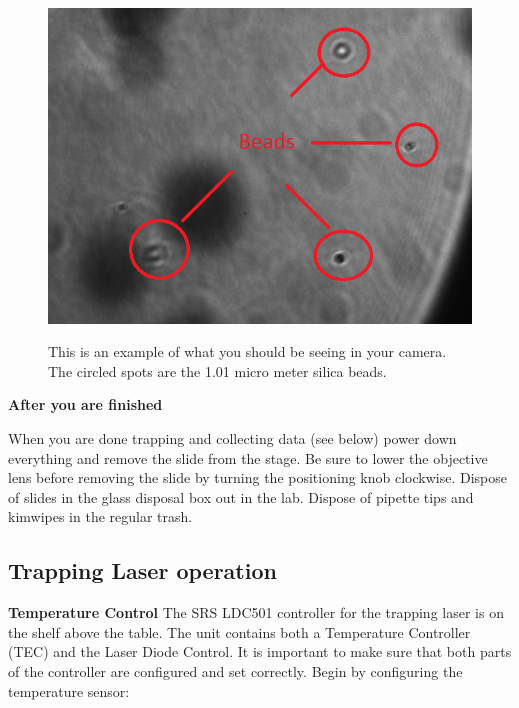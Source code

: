 \documentclass{../lab}
\begin{document}
\begin{figure}[h]
    \centering
    \href{http://experimentationlab.berkeley.edu/sites/default/files/OTZ/Beads.png}{\includegraphics[width=0.7\linewidth]{images/Beads.png}}
    \caption{This is an example of what you should be seeing in your camera. The circled spots are the 1.01 micro meter silica beads.}
    \label{fig:Beads}
\end{figure}

\textbf{After you are finished}

When you are done trapping and collecting data (see below) power down everything and remove the slide from the stage. Be sure to lower the objective lens before removing the slide by turning the positioning knob clockwise.  Dispose of slides in the glass disposal box out in the lab. Dispose of pipette tips and kimwipes in the regular trash.

\subsection{Trapping Laser operation}

\textbf{Temperature Control} The SRS LDC501 controller for the trapping laser is on the shelf above the table. The unit contains both a Temperature Controller (TEC) and the Laser Diode Control. It is important to make sure that both parts of the controller are configured and set correctly. Begin by configuring the temperature sensor:
\end{document}
